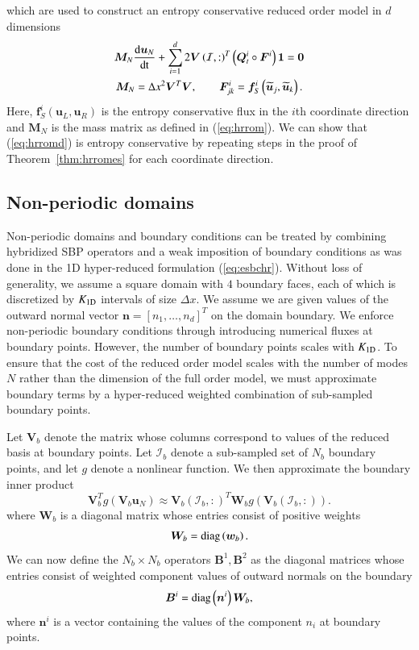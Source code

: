\documentclass[preprint,10pt]{elsarticle}
\theoremstyle{definition}
\theoremstyle{lemma}
\theoremstyle{theorem}
\theoremstyle{assumption}
\renewcommand{\tilde}{\widetilde}
\newcommand{\td}[2]{\frac{{\rm d}#1}{{\rm d}{\rm #2}}}
\newcommand{\LRp}[1]{\left( #1 \right)}
\newcommand{\LRs}[1]{\left[ #1 \right]}
\begin{document}
which are used to construct an entropy conservative reduced order model in $d$ dimensions
\begin{gather}
\bm{M}_N\td{\bm{u}_N}{t} + \sum_{i=1}^d 2\bm{V}\LRp{\mathcal{I},:}^T\LRp{\bm{Q}^i_t \circ \bm{F}^i}\bm{1} = \bm{0} \label{eq:hrromd}\\
\bm{M}_N = \Delta x^2 \bm{V}^T\bm{V}, \qquad \bm{F}^i_{jk} = \bm{f}^i_S\LRp{\tilde{\bm{u}}_j,\tilde{\bm{u}}_k}.\nonumber
\end{gather}
Here, $\bm{f}^i_S\LRp{\bm{u}_L,\bm{u}_R}$ is the entropy conservative flux in the $i$th coordinate direction and $\bm{M}_N$ is the mass matrix as defined in (\ref{eq:hrrom}).  We can show that (\ref{eq:hrromd}) is entropy conservative by repeating steps in the proof of Theorem~\ref{thm:hrromes} for each coordinate direction.  

\subsection{Non-periodic domains}

Non-periodic domains and boundary conditions can be treated by combining hybridized SBP operators and a weak imposition of boundary conditions as was done in the 1D hyper-reduced formulation (\ref{eq:esbchr}).  Without loss of generality, we assume a square domain with $4$ boundary faces, each of which is discretized by $K_{\rm 1D}$ intervals of size $\Delta x$.  We assume we are given values of the outward normal vector $\bm{n} = \LRs{n_1, \ldots, n_d}^T$ on the domain boundary.  We enforce non-periodic boundary conditions through introducing numerical fluxes at boundary points.  However, the number of boundary points scales with $K_{\rm 1D}$.  To ensure that the cost of the reduced order model scales with the number of modes $N$ rather than the dimension of the full order model, we must approximate boundary terms by a hyper-reduced weighted combination of sub-sampled boundary points.  

Let $\bm{V}_b$ denote the matrix whose columns correspond to values of the reduced basis at boundary points.  Let $\mathcal{I}_b$ denote a sub-sampled set of $N_b$ boundary points, and let $g$ denote a nonlinear function.  We then approximate the boundary inner product 
\[
\bm{V}_b^Tg(\bm{V}_b\bm{u}_N) \approx \bm{V}_b\LRp{\mathcal{I}_b,:}^T \bm{W}_b g\LRp{\bm{V}_b\LRp{\mathcal{I}_b,:}}.
\]
where $\bm{W}_b$ is a diagonal matrix whose entries consist of positive weights
\[
\bm{W}_b = {\rm diag}\LRp{\bm{w}_b}.
\]
We can now define the $N_b\times N_b$ operators $\bm{B}^1, \bm{B}^2$ as the diagonal matrices whose entries consist of weighted component values of outward normals on the boundary 
\[
\bm{B}^i = {\rm diag}\LRp{\bm{n}^i} \bm{W}_b,
\]
where $\bm{n}^i$ is a vector containing the values of the component $n_i$ at boundary points.  
\end{document}
